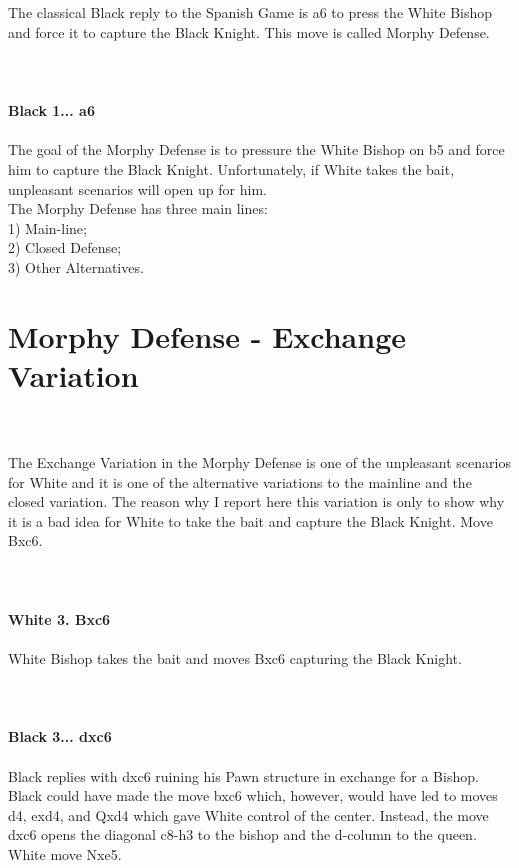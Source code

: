 \documentclass{article}
\begin{document}

\\
\\
The classical Black reply to the Spanish Game is a6 to press the White Bishop and force it to capture the Black Knight. This move is called Morphy Defense.\\
\\

\\
\\
\textbf{Black 1... a6}\\
\\
The goal of the Morphy Defense is to pressure the White Bishop on b5 and force him to capture the Black Knight. Unfortunately, if White takes the bait, unpleasant scenarios will open up for him.\\The Morphy Defense has three main lines:\\1) Main-line;\\2) Closed Defense;\\3) Other Alternatives.\\\section{ Morphy Defense - Exchange Variation}

\\
\\
The Exchange Variation in the Morphy Defense is one of the unpleasant scenarios for White and it is one of the alternative variations to the mainline and the closed variation. The reason why I report here this variation is only to show why it is a bad idea for White to take the bait and capture the Black Knight. Move Bxc6.\\
\\

\\
\\
\textbf{White 3. Bxc6}\\
\\
White Bishop takes the bait and moves Bxc6 capturing the Black Knight.\\
\\

\\
\\
\textbf{Black 3... dxc6}\\
\\
Black replies with dxc6 ruining his Pawn structure in exchange for a Bishop. Black could have made the move bxc6 which, however, would have led to moves d4, exd4, and Qxd4 which gave White control of the center. Instead, the move dxc6 opens the diagonal c8-h3 to the bishop and the d-column to the queen. White move Nxe5.\\
\end{document}
